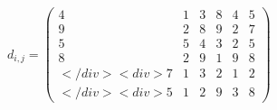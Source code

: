 \documentclass[12pt]{article}
\begin{document}
$ \begin{equation*}    d_{i,j} =     \begin{pmatrix}    4 & 1 & 3 & 8 & 4 & 5 \\    9 & 2 & 8 & 9 & 2 & 7 \\    5 & 5 & 4 & 3 & 2 & 5 \\    8 & 2 & 9 & 1 & 9 & 8 \\</div>
<div>    7 & 1 & 3 & 2 & 1 & 2 \\</div>
<div>    5 & 1 & 2 & 9 & 3 & 8    \end{pmatrix}    \end{equation*} $
\end{document}
